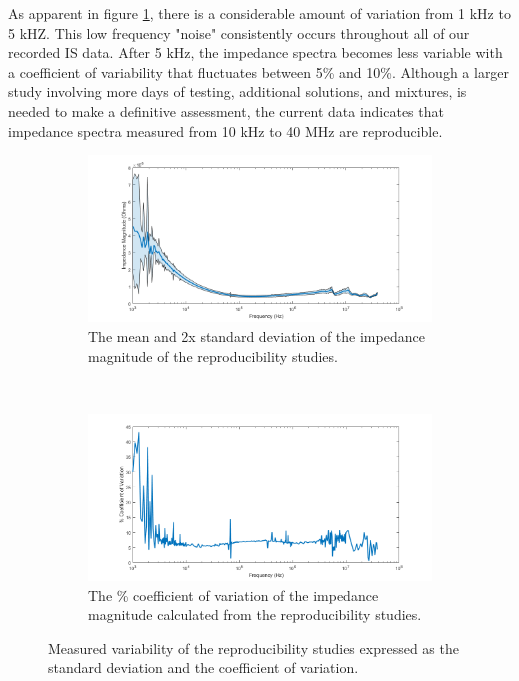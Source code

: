 \par As apparent in figure \ref{fig:IS_data_variation}, there is a considerable amount of variation from 1 kHz to 5 kHZ. This low frequency "noise" consistently occurs throughout all of our recorded IS data. After 5 kHz, the impedance spectra becomes less variable with a coefficient of variability that fluctuates between 5\% and 10\%. Although a larger study involving more days of testing, additional solutions, and mixtures, is needed to make a definitive assessment, the current data indicates that impedance spectra measured from 10 kHz to 40 MHz are reproducible.


\begin{figure}[h]
    \centering
    \begin{subfigure}[b]{\textwidth}
        \centering
        \includegraphics[width=\textwidth]{images/reproducibility_mean_std.png}
        \caption{The mean and 2x standard deviation of the impedance magnitude of the reproducibility studies.}
    \end{subfigure}
    \\
    \vspace{0.1 in}
    \begin{subfigure}[b]{\textwidth}
        \centering
        \includegraphics[width=\textwidth]{images/reproducibility_CV.png}
        \caption{The \% coefficient of variation of the impedance magnitude calculated from the reproducibility studies.}
    \end{subfigure}
    \caption{Measured variability of the reproducibility studies expressed as the standard deviation and the coefficient of variation.}
    \label{fig:IS_data_variation}
\end{figure}

